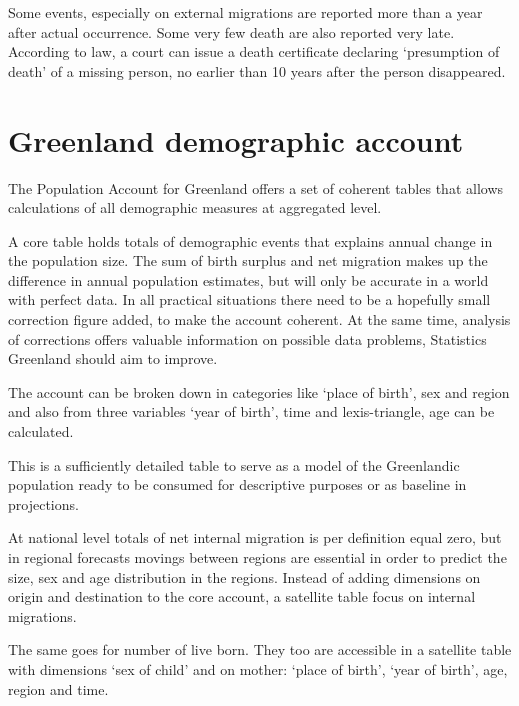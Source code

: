 \documentclass[USenglish]{article}
\begin{document}
Some events, especially on external migrations are reported more than a year after actual occurrence. Some very few death are also reported very late. According to law, a court can issue a death certificate declaring ‘presumption of death’ of a missing person, no earlier than 10 years after the person disappeared.



\section{Greenland demographic account}

The Population Account for Greenland offers a set of coherent tables that allows calculations of all demographic measures at aggregated level.

A core table holds totals of demographic events that  explains annual change in the population size. The sum of birth surplus and net migration makes up the difference in annual population estimates, but will only be accurate in a world with perfect data. In all practical situations there need to be a hopefully small correction figure added, to make the account coherent. At the same time, analysis of corrections offers valuable information on possible data problems, Statistics Greenland should aim to improve.

The account can be broken down in categories like ‘place of birth’, sex and region and also from three variables ‘year of birth’, time and lexis-triangle, age can be calculated. 

This is a sufficiently detailed table to serve as a model of the Greenlandic population ready to be consumed for descriptive purposes or as baseline in projections.

At national level totals of net internal migration is per definition equal zero, but in regional forecasts movings between regions are essential in order to predict the size, sex and age distribution in the regions. Instead of adding dimensions on origin and destination to the core account, a satellite table focus on internal migrations.

The same goes for number of live born. They too are accessible in a satellite table with dimensions ‘sex of child’ and on mother: ‘place of birth’, ‘year of birth’, age, region and time.
\end{document}
